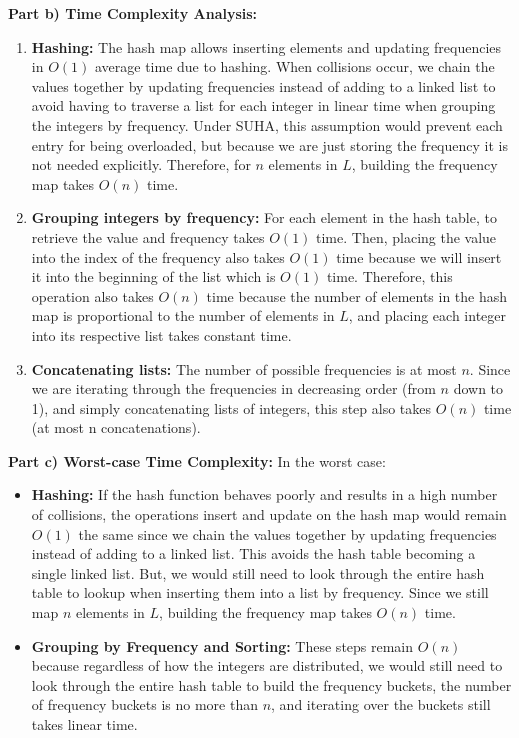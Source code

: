 \documentclass[11pt, a4paper]{article}
\begin{document}
\textbf{Part b) Time Complexity Analysis:}
\begin{enumerate}
    \item \textbf{Hashing:} The hash map allows inserting elements and updating frequencies in \( O(1) \) average time due to hashing. When collisions occur, we chain the values together by updating frequencies instead of adding to a linked list to avoid having to traverse a list for each integer in linear time when grouping the integers by frequency. Under SUHA, this assumption would prevent each entry for being overloaded, but because we are just storing the frequency it is not needed explicitly. Therefore, for \( n \) elements in \( L \), building the frequency map takes \( O(n) \) time.
    \item \textbf{Grouping integers by frequency:} For each element in the hash table, to retrieve the value and frequency takes \( O(1) \) time. Then, placing the value into the index of the frequency also takes \( O(1) \)  time because we will insert it into the beginning of the list which is \( O(1) \) time. Therefore,  this operation also takes \( O(n) \) time because the number of elements in the hash map is proportional to the number of elements in \( L \), and placing each integer into its respective list takes constant time.
    \item \textbf{Concatenating lists:} The number of possible frequencies is at most \( n \). Since we are iterating through the frequencies in decreasing order (from \( n \) down to 1), and simply concatenating lists of integers, this step also takes \( O(n) \) time (at most n concatenations).
\end{enumerate}

\textbf{Part c) Worst-case Time Complexity:}
In the worst case:
\begin{itemize}
    \item \textbf{Hashing:} If the hash function behaves poorly and results in a high number of collisions, the operations insert and update on the hash map would remain \( O(1) \) the same since we chain the values together by updating frequencies instead of adding to a linked list. This avoids the hash table becoming a single linked list. But, we would still need to look through the entire hash table to lookup when inserting them into a list by frequency. Since we still map \( n \) elements in \( L \), building the frequency map takes \( O(n) \) time.
    \item \textbf{Grouping by Frequency and Sorting:} These steps remain \( O(n) \) because regardless of how the integers are distributed, we would still need to look through the entire hash table to build the frequency buckets, the number of frequency buckets is no more than \( n \), and iterating over the buckets still takes linear time.
\end{itemize}
\end{document}
